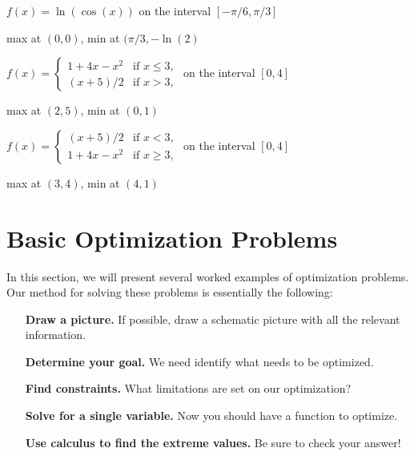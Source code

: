 \begin{exercises}
\begin{exercise}
$f(x) = \ln(\cos(x))$ on the interval $[-\pi/6,\pi/3]$
\begin{answer}
max at $(0,0)$, min at
$(\pi/3,-\ln(2)$
\end{answer}
\end{exercise}

\begin{exercise}
$f(x) = \begin{cases} 1 + 4 x -x^2 & \text{if  $x\leq 3$}, \\ 
(x+5)/2 &\text{if $x>3$},
\end{cases}$ on the interval $[0,4]$
\begin{answer} max at $(2,5)$, min at $(0,1)$
\end{answer}\end{exercise}


\begin{exercise}
$f(x) = \begin{cases} (x+5)/2 &\text{if $x<3$},\\
1 + 4 x -x^2 & \text{if  $x\ge 3$},
\end{cases}$ on the interval $[0,4]$
\begin{answer} max at $(3,4)$, min at $(4,1)$
\end{answer}\end{exercise}

\end{exercises}

















\section{Basic Optimization Problems}


In this section, we will present several worked examples of
optimization problems. Our method for solving these problems is
essentially the following:


\begin{guidelinesForOptimization}\hfil
\begin{itemize}
\item[\textbf{Draw a picture.}] If possible, draw a schematic picture with all the relevant information. 
\item[\textbf{Determine your goal.}] We need identify what needs to be
  optimized.
\item[\textbf{Find constraints.}] What limitations are set on our
  optimization?
\item[\textbf{Solve for a single variable.}] Now you should have a function to optimize.
\item[\textbf{Use calculus to find the extreme values.}] Be sure to check your answer!
\end{itemize}
\end{guidelinesForOptimization}

